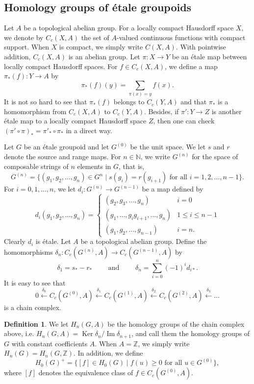 \documentclass[11pt]{article}
\theoremstyle{definition}
\newtheorem{df}[thm]{Definition}
\renewcommand{\ker}{\operatorname{Ker}}
\newcommand{\Ima}{\operatorname{Im}}
\newcommand{\N}{\mathbb{N}}
\newcommand{\Z}{\mathbb{Z}}
\begin{document}
\subsection{Homology groups of \'etale groupoids}

Let $A$ be a topological abelian group. 
For a locally compact Hausdorff space $X$, we denote by $C_c(X,A)$ 
the set of $A$-valued continuous functions with compact support. 
When $X$ is compact, we simply write $C(X,A)$. 
With pointwise addition, $C_c(X,A)$ is an abelian group. 
Let $\pi:X\to Y$ be an \'etale map between locally compact Hausdorff spaces. 
For $f\in C_c(X,A)$, we define a map $\pi_*(f):Y\to A$ by 
\[
\pi_*(f)(y)=\sum_{\pi(x)=y}f(x). 
\]
It is not so hard to see that $\pi_*(f)$ belongs to $C_c(Y,A)$ and 
that $\pi_*$ is a homomorphism from $C_c(X,A)$ to $C_c(Y,A)$. 
Besides, if $\pi':Y\to Z$ is another \'etale map to 
a locally compact Hausdorff space $Z$, then 
one can check $(\pi'\circ\pi)_*=\pi'_*\circ\pi_*$ in a direct way. 

Let $G$ be an \'etale groupoid and 
let $G^{(0)}$ be the unit space. 
We let $s$ and $r$ denote the source and range maps. 
For $n\in\N$, we write $G^{(n)}$ 
for the space of composable strings of $n$ elements in $G$, that is, 
\[
G^{(n)}=\{(g_1,g_2,\dots,g_n)\in G^n\mid
s(g_i)=r(g_{i+1})\text{ for all }i=1,2,\dots,n{-}1\}. 
\]
For $i=0,1,\dots,n$, 
we let $d_i:G^{(n)}\to G^{(n-1)}$ be a map defined by 
\[
d_i(g_1,g_2,\dots,g_n)=\begin{cases}
(g_2,g_3,\dots,g_n) & i=0 \\
(g_1,\dots,g_ig_{i+1},\dots,g_n) & 1\leq i\leq n{-}1 \\
(g_1,g_2,\dots,g_{n-1}) & i=n. 
\end{cases}
\]
Clearly $d_i$ is \'etale. 
Let $A$ be a topological abelian group. 
Define the homomorphisms 
$\delta_n:C_c(G^{(n)},A)\to C_c(G^{(n-1)},A)$ 
by 
\[
\delta_1=s_*-r_* \qquad\text{ and }\qquad
\delta_n=\sum_{i=0}^n(-1)^id_{i*}. 
\]
It is easy to see that 
\[
0\stackrel{\delta_0}{\longleftarrow}
C_c(G^{(0)},A)\stackrel{\delta_1}{\longleftarrow}
C_c(G^{(1)},A)\stackrel{\delta_2}{\longleftarrow}
C_c(G^{(2)},A)\stackrel{\delta_3}{\longleftarrow}\dots
\]
is a chain complex. 

\begin{df}\label{homology}
We let $H_n(G,A)$ be the homology groups of the chain complex above, 
i.e. $H_n(G,A)=\ker\delta_n/\Ima\delta_{n+1}$, 
and call them the homology groups of $G$ with constant coefficients $A$. 
When $A=\Z$, we simply write $H_n(G)=H_n(G,\Z)$. 
In addition, we define 
\[
H_0(G)^+=\{[f]\in H_0(G)\mid f(u)\geq0\text{ for all }u\in G^{(0)}\}, 
\]
where $[f]$ denotes the equivalence class of $f\in C_c(G^{(0)},A)$. 
\end{df}
\end{document}
